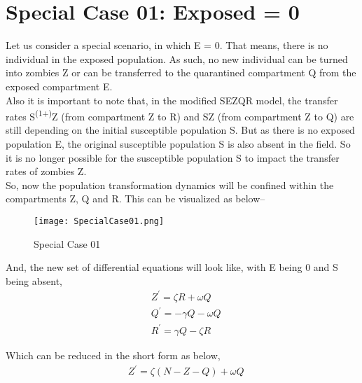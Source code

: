 \pagebreak
\section{Special Case 01: Exposed = 0}

Let us consider a special scenario, in which E = 0. That means, there is no individual in the exposed population. As such, no new individual can be turned into zombies Z or can be transferred to the quarantined compartment Q from the exposed compartment E. \\

Also it is important to note that, in the modified SEZQR model, the transfer rates \textalpha S\textsuperscript{(1+\textmu)}Z (from compartment Z to R) and \textsigma SZ (from compartment Z to Q) are still depending on the initial susceptible population S. But as there is no exposed population E, the original susceptible population S is also absent in the field. So it is no longer possible for the susceptible population S to impact the transfer rates of zombies Z. \\

So, now the population transformation dynamics will be confined within the compartments Z, Q and R. This can be visualized as below-- \\

\begin{figure}[H]
\centering
\texttt{[image: SpecialCase01.png]}
\caption{Special Case 01}
\label{fig:Special Case 01}
\end{figure}


And, the new set of differential equations will look like, with E being 0 and S being absent, \\

\begin{equation}
\begin{aligned}
&Z^{\prime}=\zeta R+\omega Q \\
&Q^{\prime}=-\gamma Q-\omega Q \\
&R^{\prime}=\gamma Q-\zeta R
\end{aligned}
\end{equation}

Which can be reduced in the short form as below, \\

\begin{equation}
\begin{aligned}
&Z^{\prime}=\zeta (N - Z - Q)+\omega Q
\end{aligned}
\end{equation}


